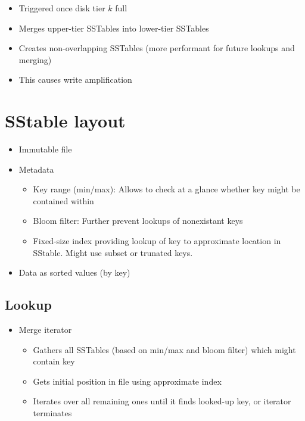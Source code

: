 \documentclass[a4paper]{scrreprt}
\begin{document}
\begin{itemize}
		\item Triggered once disk tier $k$ full
		\item Merges upper-tier SSTables into lower-tier SSTables
		\item Creates non-overlapping SSTables (more performant for future lookups and merging)
		\item This causes write amplification
\end{itemize}

\section{SStable layout}

\begin{itemize}
		\item Immutable file
		\item Metadata
				\begin{itemize}
						\item Key range (min/max): Allows to check at a glance whether key might be contained within
						\item Bloom filter: Further prevent lookups of nonexistant keys
						\item Fixed-size index providing lookup of key to
								approximate location in SStable. Might use
								subset or trunated keys.
				\end{itemize}
		\item Data as sorted values (by key)
\end{itemize}

\subsection{Lookup}

\begin{itemize}
		\item Merge iterator
				\begin{itemize}
						\item Gathers all SSTables (based on min/max and bloom
								filter) which might contain key
						\item Gets initial position in file using approximate index
						\item Iterates over all remaining ones until it finds
								looked-up key, or iterator terminates
				\end{itemize}
\end{itemize}
\end{document}
